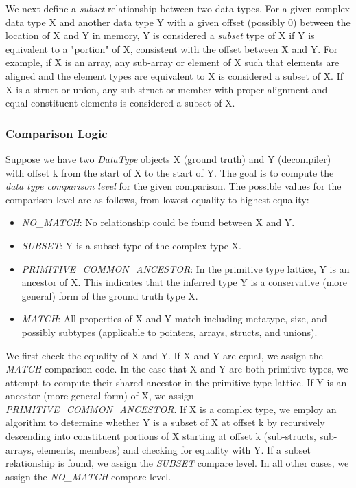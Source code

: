 
We next define a \emph{subset} relationship between two data types. For a given complex data type X and another data type Y with a given offset (possibly 0) between the location of X and Y in memory, Y is considered a \emph{subset} type of X if Y is equivalent to a "portion" of X, consistent with the offset between X and Y. For example, if X is an array, any sub-array or element of X such that elements are aligned and the element types are equivalent to X is considered a subset of X. If X is a struct or union, any sub-struct or member with proper alignment and equal constituent elements is considered a subset of X.

\subsubsection{Comparison Logic}

Suppose we have two \emph{DataType} objects X (ground truth) and Y (decompiler) with offset k from the start of X to the start of Y. The goal is to compute the \emph{data type comparison level} for the given comparison. The possible values for the comparison level are as follows, from lowest equality to highest equality:

\begin{itemize}
    \item \emph{NO\_MATCH}: No relationship could be found between X and Y.
    \item \emph{SUBSET}: Y is a subset type of the complex type X.
    \item \emph{PRIMITIVE\_COMMON\_ANCESTOR}: In the primitive type lattice, Y is an ancestor of X. This indicates that the inferred type Y is a conservative (more general) form of the ground truth type X.
    \item \emph{MATCH}: All properties of X and Y match including metatype, size, and possibly subtypes (applicable to pointers, arrays, structs, and unions).
\end{itemize}

We first check the equality of X and Y. If X and Y are equal, we assign the \emph{MATCH} comparison code. In the case that X and Y are both primitive types, we attempt to compute their shared ancestor in the primitive type lattice. If Y is an ancestor (more general form) of X, we assign \emph{PRIMITIVE\_COMMON\_ANCESTOR}. If X is a complex type, we employ an algorithm to determine whether Y is a subset of X at offset k by recursively descending into constituent portions of X starting at offset k (sub-structs, sub-arrays, elements, members) and checking for equality with Y. If a subset relationship is found, we assign the \emph{SUBSET} compare level. In all other cases, we assign the \emph{NO\_MATCH} compare level.

